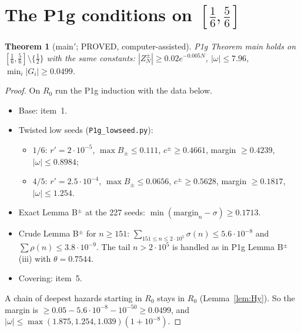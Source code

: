 \documentclass[11pt]{article}
\newtheorem{theorem}{Theorem}\newtheorem{lemma}[theorem]{Lemma}\newtheorem{proposition}[theorem]{Proposition}
\theoremstyle{remark}\newtheorem{remark}[theorem]{Remark}
\begin{document}
\section{The P1g conditions on $[\frac16,\frac56]$}
\begin{theorem}[main$'$; PROVED, computer-assisted]\label{thm:main}
P1g Theorem main holds on $[\frac16,\frac56]\setminus\{\frac12\}$ with the same constants: $|Z^\pm_N|\ge0.02e^{-0.005N}$, $|\omega|\le7.96$, $\min_i|G_i|\ge0.0499$.
\end{theorem}
\begin{proof}
On $R_0$ run the P1g induction with the data below.
\begin{itemize}
\item Base: item~1.
\item Twisted low seeds (\texttt{P1g\_lowseed.py}):
 \begin{itemize}
 \item $1/6$: $r'=2\cdot10^{-5}$, $\max B_\pm\le0.111$, $c^\pm\ge0.4661$, margin $\ge0.4239$, $|\omega|\le0.8984$;
 \item $4/5$: $r'=2.5\cdot10^{-4}$, $\max B_\pm\le0.0656$, $c^\pm\ge0.5628$, margin $\ge0.1817$, $|\omega|\le1.254$.
 \end{itemize}
\item Exact Lemma B$^\pm$ at the 227 seeds: $\min(\text{margin}_n-\sigma)\ge0.1713$.
\item Crude Lemma B$^\pm$ for $n\ge151$: $\sum_{151\le n\le2\cdot10^5}\sigma(n)\le5.6\cdot10^{-8}$ and $\sum\rho(n)\le3.8\cdot10^{-9}$. The tail $n>2\cdot10^5$ is handled as in P1g Lemma B$^\pm$(iii) with $\theta=0.7544$.
\item Covering: item~5.
\end{itemize}
A chain of deepest hazards starting in $R_0$ stays in $R_0$ (Lemma~\ref{lem:Hy}). So the margin is $\ge0.05-5.6\cdot10^{-8}-10^{-50}\ge0.0499$, and $|\omega|\le\max(1.875,1.254,1.039)(1+10^{-8})$.
\end{proof}
\end{document}
